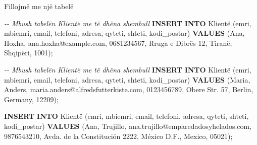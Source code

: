 \documentclass[
  ignorenonframetext,
]{beamer}
\newenvironment{Shaded}{\begin{snugshade}}{\end{snugshade}}
\newcommand{\CommentTok}[1]{\textcolor[rgb]{0.56,0.35,0.01}{\textit{#1}}}
\newcommand{\KeywordTok}[1]{\textcolor[rgb]{0.13,0.29,0.53}{\textbf{#1}}}
\newcommand{\NormalTok}[1]{#1}
\newcommand{\StringTok}[1]{\textcolor[rgb]{0.31,0.60,0.02}{#1}}
\begin{document}
\begin{frame}[fragile]{Fillojmë me një tabelë}
\label{fillojmuxeb-me-njuxeb-tabeluxeb-1}

\begin{Shaded}
\begin{Highlighting}[]
\CommentTok{{-}{-} Mbush tabelën Klientë me të dhëna shembull}
\KeywordTok{INSERT} \KeywordTok{INTO}\NormalTok{ Klientë (emri, mbiemri, email, telefoni, adresa, qyteti, shteti, kodi\_postar)}
\KeywordTok{VALUES}\NormalTok{ (}\StringTok{\textquotesingle{}Ana\textquotesingle{}}\NormalTok{, }\StringTok{\textquotesingle{}Hoxha\textquotesingle{}}\NormalTok{, }\StringTok{\textquotesingle{}ana.hoxha@example.com\textquotesingle{}}\NormalTok{, }\StringTok{\textquotesingle{}0681234567\textquotesingle{}}\NormalTok{, }\StringTok{\textquotesingle{}Rruga e Dibrës 12\textquotesingle{}}\NormalTok{, }\StringTok{\textquotesingle{}Tiranë\textquotesingle{}}\NormalTok{, }\StringTok{\textquotesingle{}Shqipëri\textquotesingle{}}\NormalTok{, }\StringTok{\textquotesingle{}1001\textquotesingle{}}\NormalTok{);}

\CommentTok{{-}{-} Mbush tabelën Klientë me të dhëna shembull}
\KeywordTok{INSERT} \KeywordTok{INTO}\NormalTok{ Klientë (emri, mbiemri, email, telefoni, adresa, qyteti, shteti, kodi\_postar)}
\KeywordTok{VALUES}\NormalTok{ (}\StringTok{\textquotesingle{}Maria\textquotesingle{}}\NormalTok{, }\StringTok{\textquotesingle{}Anders\textquotesingle{}}\NormalTok{, }\StringTok{\textquotesingle{}maria.anders@alfredsfutterkiste.com\textquotesingle{}}\NormalTok{, }\StringTok{\textquotesingle{}0123456789\textquotesingle{}}\NormalTok{, }\StringTok{\textquotesingle{}Obere Str. 57\textquotesingle{}}\NormalTok{, }\StringTok{\textquotesingle{}Berlin\textquotesingle{}}\NormalTok{, }\StringTok{\textquotesingle{}Germany\textquotesingle{}}\NormalTok{, }\StringTok{\textquotesingle{}12209\textquotesingle{}}\NormalTok{);}

\KeywordTok{INSERT} \KeywordTok{INTO}\NormalTok{ Klientë (emri, mbiemri, email, telefoni, adresa, qyteti, shteti, kodi\_postar)}
\KeywordTok{VALUES}\NormalTok{ (}\StringTok{\textquotesingle{}Ana\textquotesingle{}}\NormalTok{, }\StringTok{\textquotesingle{}Trujillo\textquotesingle{}}\NormalTok{, }\StringTok{\textquotesingle{}ana.trujillo@emparedadosyhelados.com\textquotesingle{}}\NormalTok{, }\StringTok{\textquotesingle{}9876543210\textquotesingle{}}\NormalTok{, }\StringTok{\textquotesingle{}Avda. de la Constitución 2222\textquotesingle{}}\NormalTok{, }\StringTok{\textquotesingle{}México D.F.\textquotesingle{}}\NormalTok{, }\StringTok{\textquotesingle{}Mexico\textquotesingle{}}\NormalTok{, }\StringTok{\textquotesingle{}05021\textquotesingle{}}\NormalTok{);}


\end{Highlighting}
\end{Shaded}
\end{frame}
\end{document}
